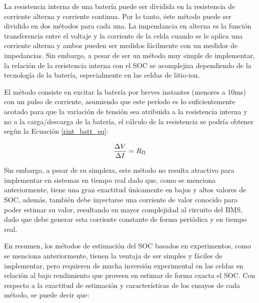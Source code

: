 \documentclass[10pt,a4paper]{article}
\begin{document}
\noindent La resistencia interna de una bater\'ia puede ser dividida en la
resistencia de corriente alterna y corriente continua. Por lo tanto,
\'este m\'etodo puede ser dividido en dos m\'etodos para cada una. 
La impendancia en alterna es la funci\'on transferencia entre el
voltaje y la corriente de la celda cuando se le aplica una corriente
alterna y ambos pueden ser medidos f\'acilmente con un medidor de impedancias. 
Sin embargo, a pesar de ser un m\'etodo muy simple de implementar, la relaci\'on 
de la resistencia interna con el SOC se acomplejiza dependiendo de la 
tecnolog\'ia de la bater\'ia, especialmente en las celdas de litio-ion.

\noindent El m\'etodo consiste en excitar la bater\'ia por breves instantes 
(menores a 10ms) con un pulso de corriente, asumiendo que este per\'iodo es lo 
suficientemente acotado para que la variaci\'on de tensi\'on sea atribuida a la 
resistencia interna y no a la carga/descarga de la bater\'ia, el c\'alculo de la 
resistencia se podr\'ia obtener seg\'un la Ecuaci\'on
\ref{rint_batt_eq}:

\begin{equation}
    \frac{\Delta V}{\Delta I} = R_{\ohm} \label{rint_batt_eq}
\end{equation}

Sin embargo, a pesar de su simpleza, este m\'etodo no resulta atractivo para
implementar en sistemas en tiempo real dado que, como se menciona anteriormente,
tiene una gran exactitud \'unicamente en bajos y altos valores de \acrshort{SOC},
adem\'as, tambi\'en debe inyectarse una corriente de valor conocido para poder
estimar su valor, resultando en mayor complejidad al circuito del
\acrshort{BMS}, dado que debe generar esta corriente constante de forma
peri\'odica y en tiempo real.

\noindent En resumen, los m\'etodos de estimaci\'on del \acrshort{SOC} basados
en experimentos, como se menciona anteriormente, tienen la ventaja de ser 
simples y f\'aciles de implementar, pero requieren de mucha inversi\'on 
experimental en las celdas en relaci\'on al bajo rendimiento que proveen en 
estimar de forma exacta el \acrshort{SOC}. Con respecto a la exactitud de 
estimaci\'on y caracter\'isticas de los ensayos de cada m\'etodo, se puede decir 
que:
\end{document}

